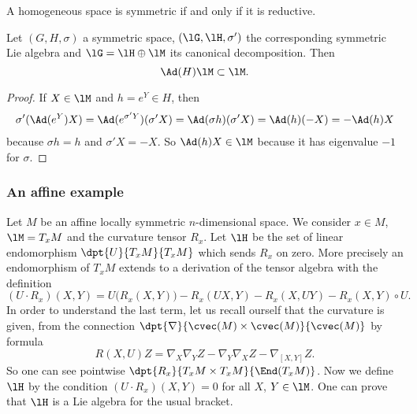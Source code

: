 A homogeneous space is symmetric if and only if it is reductive.

\begin{proposition}
Let $(G,H,\sigma)$ a symmetric space, $(\lG,\lH,\sigma')$ the corresponding symmetric Lie algebra and $\lG=\lH\oplus\lM$ its canonical decomposition. Then
\[
   \Ad(H)\lM\subset\lM.
\]
\end{proposition}

\begin{proof}
If $X\in\lM$ and $h=e^Y\in H$, then
\begin{align*}
\sigma'(\Ad(e^Y)X)=\Ad(e^{\sigma'Y})(\sigma'X)
                  =\Ad(\sigma h)(\sigma'X)
                  =\Ad(h)(-X)
                  =-\Ad(h)X
\end{align*}
because $\sigma h=h$ and $\sigma'X=-X$. So $\Ad(h)X\in\lM$ because it has eigenvalue $-1$ for $\sigma$.
\end{proof}

\subsubsection{An affine example}

Let $M$ be an affine locally symmetric $n$-dimensional space. We consider $x\in M$, $\lM=T_xM$ and the curvature tensor $R_x$. Let $\lH$ be the set of linear endomorphism $\dpt{U}{T_xM}{T_xM}$ which sends $R_x$ on zero. More precisely an endomorphism of $T_xM$ extends to a derivation of the tensor algebra with the definition
\begin{equation} \label{eq:defHa}
(U\cdot R_x)(X,Y)=U\big( R_x(X,Y) \big)-R_x(UX,Y)-R_x(X,UY)-R_x(X,Y)\circ U.
\end{equation}
In order to understand the last term, let us recall ourself that the curvature is given, from the connection $\dpt{\nabla}{\cvec(M)\times\cvec(M)}{\cvec(M)}$ by formula
\[
  R(X,U)Z=\nabla_X\nabla_Y Z-\nabla_Y\nabla_XZ-\nabla_{[X,Y]}Z.
\]
So one can see pointwise $\dpt{R_x}{T_xM\times T_xM}{\End(T_xM)}$. Now we define $\lH$ by the condition $(U\cdot R_x)(X,Y)=0$ for all $X$, $Y\in\lM$. One can prove that $\lH$ is a Lie algebra for the usual bracket.

